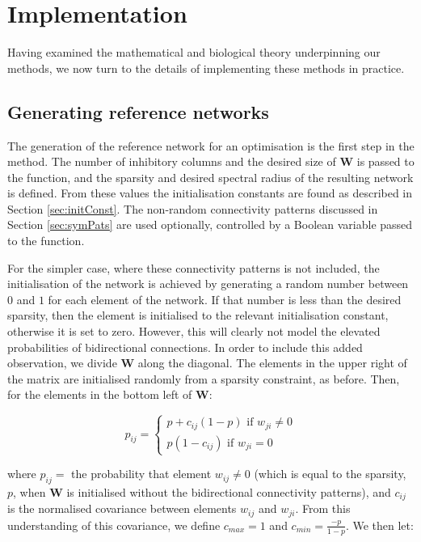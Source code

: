 \documentclass[12pt, a4paper]{article}
\begin{document}
\section{Implementation}

Having examined the mathematical and biological theory underpinning our methods, we now turn to the details of implementing these methods in practice.  

\subsection{Generating reference networks}
\label{sec:netGen}
The generation of the reference network for an optimisation is the first step in the method.  The number of inhibitory columns and the desired size of $\mathbf{W}$ is passed to the function, and the sparsity and desired spectral radius of the resulting network is defined.  From these values the initialisation constants are found as described in Section \ref{sec:initConst}.  The non-random connectivity patterns discussed in Section \ref{sec:symPats} are used optionally, controlled by a Boolean variable passed to the function.

For the simpler case, where these connectivity patterns is not included, the initialisation of the network is achieved by generating a random number between $0$ and $1$ for each element of the network.  If that number is less than the desired sparsity, then the element is initialised to the relevant initialisation constant, otherwise it is set to zero. However, this will clearly not model the elevated probabilities of bidirectional connections.   In order to include this added observation, we divide $\mathbf{W}$ along the diagonal.  The elements in the upper right of the matrix are initialised randomly from a sparsity constraint, as before.  Then, for the elements in the bottom left of $\mathbf{W}$:

    \begin{equation}        p_{ij} = \left \{ \substack{p + c_{ij}(1 - p) \text{ if } w_{ji} \neq 0 \\ p(1 - c_{ij}) \text{ if } w_{ji} = 0} \right. \label{eqn:corrEqn} \end{equation}

\noindent where $p_{ij} =$ the probability that element $w_{ij} \neq 0$  (which is equal to the sparsity, $p$, when $\mathbf{W}$ is initialised without the bidirectional connectivity patterns), and $c_{ij}$ is the normalised covariance between elements $w_{ij}$ and $w_{ji}$.  From this understanding of this covariance, we define $c_{max} = 1$ and $c_{min} = \frac{-p}{1-p}$.  We then let:
\end{document}

